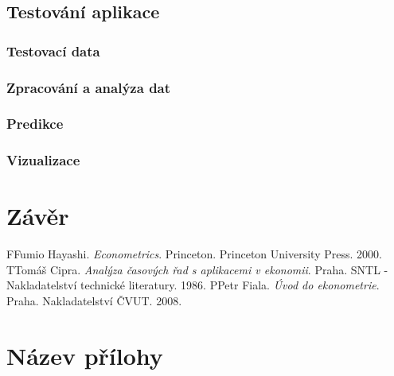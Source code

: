 \documentclass[a4paper,12pt,twoside]{scrreprt}
\begin{document}
\section{Testování aplikace}
\subsection{Testovací data}
\subsection{Zpracování a analýza dat}
\subsection{Predikce}
\subsection{Vizualizace}


\chapter*{Závěr}
%
%


\clearpage
{} %
\begin{thebibliography}{99}   
	\bibitem FFumio Hayashi. \emph{Econometrics}. Princeton. Princeton University Press. 2000.
	\bibitem TTomáš Cipra. \emph{Analýza časových řad s aplikacemi v ekonomii}. Praha. SNTL - Nakladatelství technické literatury. 1986.
	\bibitem PPetr Fiala. \emph{Úvod do ekonometrie}. Praha. Nakladatelství ČVUT. 2008.
\end{thebibliography}

\newpage %
\appendix %

\chapter{Název přílohy} %
%
%
\end{document}
